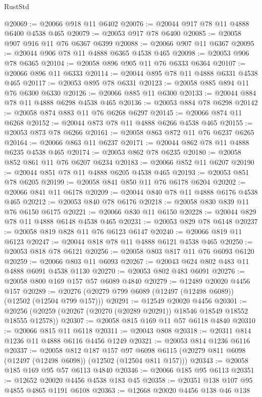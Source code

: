 \begin{lexlean}{RustStd}
\begin{coremodule}
@20069 := @20066 @918 @11 @6402
@20076 := @20044 @917 @78 @11 @4888 @6400 @4538 @465
@20079 := @20053 @917 @78 @6400
@20085 := @20058 @907 @916 @11 @76 @6367 @6399
@20088 := @20066 @907 @11 @6367
@20095 := @20044 @906 @78 @11 @4888 @6365 @4538 @465
@20098 := @20053 @906 @78 @6365
@20104 := @20058 @896 @905 @11 @76 @6333 @6364
@20107 := @20066 @896 @11 @6333
@20114 := @20044 @895 @78 @11 @4888 @6331 @4538 @465
@20117 := @20053 @895 @78 @6331
@20123 := @20058 @885 @894 @11 @76 @6300 @6330
@20126 := @20066 @885 @11 @6300
@20133 := @20044 @884 @78 @11 @4888 @6298 @4538 @465
@20136 := @20053 @884 @78 @6298
@20142 := @20058 @874 @883 @11 @76 @6268 @6297
@20145 := @20066 @874 @11 @6268
@20152 := @20044 @873 @78 @11 @4888 @6266 @4538 @465
@20155 := @20053 @873 @78 @6266
@20161 := @20058 @863 @872 @11 @76 @6237 @6265
@20164 := @20066 @863 @11 @6237
@20171 := @20044 @862 @78 @11 @4888 @6235 @4538 @465
@20174 := @20053 @862 @78 @6235
@20180 := @20058 @852 @861 @11 @76 @6207 @6234
@20183 := @20066 @852 @11 @6207
@20190 := @20044 @851 @78 @11 @4888 @6205 @4538 @465
@20193 := @20053 @851 @78 @6205
@20199 := @20058 @841 @850 @11 @76 @6178 @6204
@20202 := @20066 @841 @11 @6178
@20209 := @20044 @840 @78 @11 @4888 @6176 @4538 @465
@20212 := @20053 @840 @78 @6176
@20218 := @20058 @830 @839 @11 @76 @6150 @6175
@20221 := @20066 @830 @11 @6150
@20228 := @20044 @829 @78 @11 @4888 @6148 @4538 @465
@20231 := @20053 @829 @78 @6148
@20237 := @20058 @819 @828 @11 @76 @6123 @6147
@20240 := @20066 @819 @11 @6123
@20247 := @20044 @818 @78 @11 @4888 @6121 @4538 @465
@20250 := @20053 @818 @78 @6121
@20256 := @20058 @803 @817 @11 @76 @6093 @6120
@20259 := @20066 @803 @11 @6093
@20267 := @20043 @624 @802 @483 @11 @4888 @6091 @4538 @1130
@20270 := @20053 @802 @483 @6091
@20276 := @20058 @800 @169 @157 @57 @6089 @4840
@20279 := @12489 @20020 @4456 @157
@20289 := @20276 (@20279 @799 @6089 (@12497 (@12498 @6089)) (@12502 (@12504 @799 @157)))
@20291 := @12549 @20020 @4456
@20301 := @20256 (@20259 (@20267 (@20270 (@20289 @20291)) @18546 @18549 @18552 @18555 @12578))
@20307 := @20058 @815 @169 @11 @57 @6118 @4840
@20310 := @20066 @815 @11 @6118
@20311 := @20043 @808
@20318 := @20311 @814 @1236 @11 @4888 @6116 @4456 @1249
@20321 := @20053 @814 @1236 @6116
@20337 := @20058
    @812
    @187
    @157
    @97
    @6098
    @6115
    (@20279 @811 @6098 (@12497 (@12498 @6098)) (@12502 (@12504 @811 @157)))
@20343 := @20058 @185 @169 @95 @57 @6113 @4840
@20346 := @20066 @185 @95 @6113
@20351 := @12652 @20020 @4456 @4538 @183 @45
@20358 := @20351 @138 @107 @95 @4855 @4865 @1191 @6108
@20363 := @12668 @20020 @4456 @138 @46 @138

\end{coremodule}
\end{lexlean}
